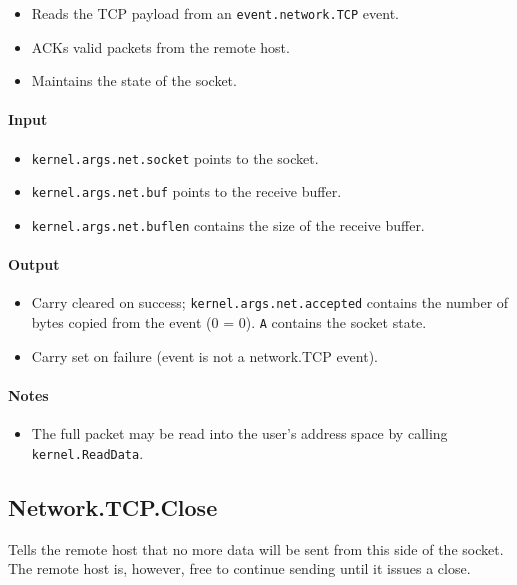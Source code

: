 \begin{itemize}
\item Reads the TCP payload from an \verb+event.network.TCP+ event.
\item ACKs valid packets from the remote host.
\item Maintains the state of the socket. 
\end{itemize}

\paragraph{Input}

\begin{itemize}
\item \verb+kernel.args.net.socket+ points to the socket.
\item \verb+kernel.args.net.buf+ points to the receive buffer.
\item \verb+kernel.args.net.buflen+ contains the size of the receive buffer.
\end{itemize}

\paragraph{Output}

\begin{itemize}
\item Carry cleared on success; \verb+kernel.args.net.accepted+ contains the number of bytes copied from the event (0 = 0). \verb+A+ contains the socket state.
\item Carry set on failure (event is not a network.TCP event).
\end{itemize}

\paragraph{Notes}

\begin{itemize}
\item The full packet may be read into the user's address space by calling \verb+kernel.ReadData+.
\end{itemize}

\subsection*{Network.TCP.Close}
Tells the remote host that no more data will be sent from this side of the socket.  The remote host is, however, free to continue sending until it issues a close.

